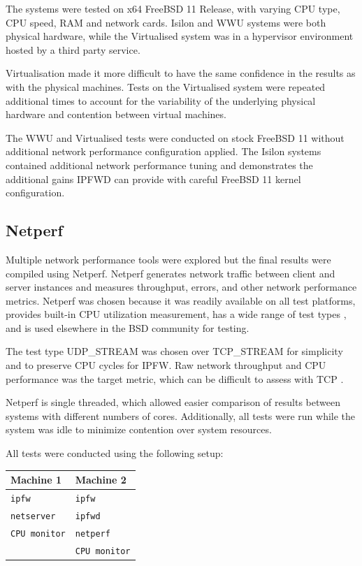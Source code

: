 \documentclass[journal]{IEEEtran}
\begin{document}
  The systems were tested on x64 FreeBSD 11 Release, with varying CPU type, CPU
  speed, RAM and network cards. Isilon and WWU systems were both physical
  hardware, while the Virtualised system was in a hypervisor environment hosted
  by a third party service.

  Virtualisation made it more difficult to have the same confidence in the
  results as with the physical machines. Tests on the Virtualised system were
  repeated additional times to account for the variability of the underlying
  physical hardware and contention between virtual machines.

  The WWU and Virtualised tests were conducted on stock FreeBSD 11 without
  additional network performance configuration applied. The Isilon systems
  contained additional network performance tuning and demonstrates the
  additional gains IPFWD can provide with careful FreeBSD 11 kernel
  configuration.

  \subsection{Netperf}

    Multiple network performance tools were explored but the final results were
    compiled using Netperf. Netperf generates network traffic between client
    and server instances and measures throughput, errors, and other network
    performance metrics. Netperf was chosen because it was readily available
    on all test platforms, provides built-in CPU utilization measurement, has a
    wide range of test types \cite{netperf}, and is used elsewhere in the BSD
    community for testing.

    The test type UDP\_STREAM was chosen over TCP\_STREAM for simplicity and to
    preserve CPU cycles for IPFW. Raw network throughput and CPU performance
    was the target metric, which can be difficult to assess with TCP
    \cite{netperf}.

    Netperf is single threaded, which allowed easier comparison of results
    between systems with different numbers of cores. Additionally, all tests
    were run while the system was idle to minimize contention over system
    resources. 

    All tests were conducted using the following setup:
    \begin{center}
    \begin{tabular}{ | L{10em} | L{10em} | } 
      \hline
      Machine 1 & Machine 2 \\
      \hline
      \hline
      \texttt{ipfw}        & \texttt{ipfw} \\
      \texttt{netserver}   & \texttt{ipfwd} \\
      \texttt{CPU monitor} & \texttt{netperf} \\
                           & \texttt{CPU monitor} \\
      \hline
    \end{tabular} \\
    \end{center}
\end{document}
